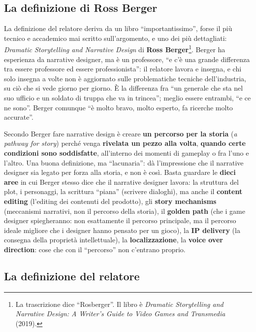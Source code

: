 \subsection{La definizione di Ross Berger}

La definizione del relatore deriva da un libro ``importantissimo'', forse il
più tecnico e accademico mai scritto sull'argomento, e uno dei più
dettagliati: \emph{Dramatic Storytelling and Narrative Design} di
\textbf{Ross Berger}\footnote{La trascrizione dice ``Rosberger''. Il libro è
\emph{Dramatic Storytelling and Narrative Design: A Writer's Guide to Video
Games and Transmedia} (2019).}. Berger ha esperienza da narrative designer,
ma è un professore, ``e c'è una grande differenza tra essere professore ed
essere professionista'': il relatore lavora e insegna, e chi solo insegna a
volte non è aggiornato sulle problematiche tecniche dell'industria, su ciò
che si vede giorno per giorno. È la differenza fra ``un generale che sta nel
suo ufficio e un soldato di truppa che va in trincea''; meglio essere
entrambi, ``e ce ne sono''. Berger comunque ``è molto bravo, molto esperto, fa
ricerche molto accurate''.

Secondo Berger fare narrative design è creare \textbf{un percorso per la
storia} (\emph{a pathway for story}) perché venga \textbf{rivelata un pezzo
alla volta}, \textbf{quando certe condizioni sono soddisfatte}, all'interno
dei momenti di gameplay o fra l'uno e l'altro. Una buona definizione, ma
``lacunaria'': dà l'impressione che il narrative designer sia legato per forza
alla storia, e non è così. Basta guardare le \textbf{dieci aree} in cui
Berger stesso dice che il narrative designer lavora: la struttura del plot,
i personaggi, la scrittura ``piana'' (scrivere dialoghi), ma anche il
\textbf{content editing} (l'editing dei contenuti del prodotto), gli
\textbf{story mechanisms} (meccanismi narrativi, non il percorso della
storia), il \textbf{golden path} (che i game designer spiegheranno: non
esattamente il percorso principale, ma il percorso ideale migliore che i
designer hanno pensato per un gioco), la \textbf{IP delivery} (la consegna
della proprietà intellettuale), la \textbf{localizzazione}, la \textbf{voice
over direction}: cose che con il ``percorso'' non c'entrano proprio.

\subsection{La definizione del relatore}

